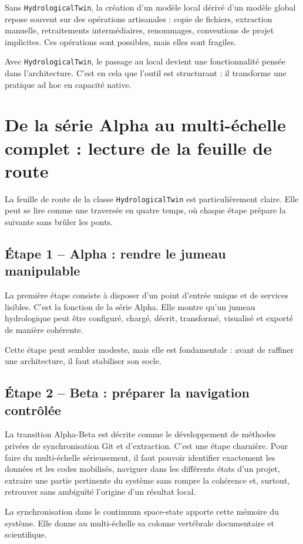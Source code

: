 \documentclass[11pt,a4paper]{article}
\newcommand{\hydrot}{\texttt{HydrologicalTwin}}
\begin{document}
Sans \hydrot{}, la création d'un modèle local dérivé d'un modèle global repose souvent sur des opérations artisanales : copie de fichiers, extraction manuelle, retraitements intermédiaires, renommages, conventions de projet implicites. Ces opérations sont possibles, mais elles sont fragiles.

Avec \hydrot{}, le passage au local devient une fonctionnalité pensée dans l'architecture. C'est en cela que l'outil est structurant : il transforme une pratique ad hoc en capacité native.

\section{De la série Alpha au multi-échelle complet : lecture de la feuille de route}

La feuille de route de la classe \texttt{HydrologicalTwin} est particulièrement claire. Elle peut se lire comme une traversée en quatre temps, où chaque étape prépare la suivante sans brûler les ponts.

\subsection{Étape 1 -- Alpha : rendre le jumeau manipulable}

La première étape consiste à disposer d'un point d'entrée unique et de services lisibles. C'est la fonction de la série Alpha. Elle montre qu'un jumeau hydrologique peut être configuré, chargé, décrit, transformé, visualisé et exporté de manière cohérente.

Cette étape peut sembler modeste, mais elle est fondamentale : avant de raffiner une architecture, il faut stabiliser son socle.

\subsection{Étape 2 -- Beta : préparer la navigation contrôlée}

La transition Alpha-Beta est décrite comme le développement de méthodes privées de synchronisation Git et d'extraction. C'est une étape charnière. Pour faire du multi-échelle sérieusement, il faut pouvoir identifier exactement les données et les codes mobilisés, naviguer dans les différents états d'un projet, extraire une partie pertinente du système sans rompre la cohérence et, surtout, retrouver sans ambiguïté l'origine d'un résultat local.

La synchronisation dans le continuum space-state apporte cette mémoire du système. Elle donne au multi-échelle sa colonne vertébrale documentaire et scientifique.
\end{document}
